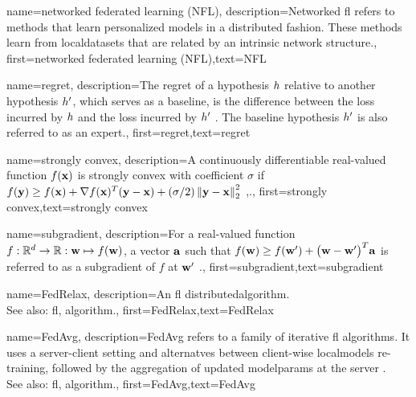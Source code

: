 {name={networked federated learning (NFL)},
	description={Networked \gls{fl} refers 
		to methods that learn personalized \gls{model}s in a distributed fashion. These methods learn from \gls{localdataset}s 
		that are related by an intrinsic network structure.},
 first={networked federated learning (NFL)},text={NFL} 
}




{name={regret},
	description={The regret of a \gls{hypothesis} $h$ relative to 
		another \gls{hypothesis} $h'$, which serves as a \gls{baseline}, 
		is the difference between the \gls{loss} incurred by $h$ and the \gls{loss} 
		incurred by $h'$ \cite{PredictionLearningGames}. 
		The \gls{baseline} \gls{hypothesis} $h'$ is also referred to as an \gls{expert}.},
	first={regret},text={regret} 
}

{name={strongly convex},
	description={A continuously \gls{differentiable} real-valued 
		function $f({\bf x})$ is strongly \gls{convex} with coefficient $\sigma$ if $f({\bf y}) \geq f({\bf x}) + \nabla f({\bf x})^{T} ({\bf y} - {\bf x}) + (\sigma/2) \left\Vert {{\bf y}- {\bf x}} \right\Vert_{2}^{2}$ \cite{nesterov04},\cite[Sec. B.1.1]{CvxAlgBertsekas}.},
	first={strongly convex},text={strongly convex} 
}

{name={subgradient},
description={For a real-valued function $f: \mathbb{R}^{d} \rightarrow \mathbb{R}: {\bf w} \mapsto f({\bf w})$, 
		a vector ${\bf a}$ such that $f({\bf w}) \geq  f({\bf w}') +\big({\bf w}-{\bf w}' \big)^{T} {\bf a}$ is 
		referred to as a subgradient of $f$ at ${\bf w}'$ \cite{BertCvxAnalOpt,BertsekasNonLinProgr}.},
	first={subgradient},text={subgradient} 
}

{name={FedRelax},
	description={An \gls{fl} \gls{distributedalgorithm}. 
		\\ 
		See also: \gls{fl}, \gls{algorithm}.},
	first={FedRelax},text={FedRelax}
} 

{name={FedAvg},
	description={FedAvg refers to a family of iterative \gls{fl} \glspl{algorithm}. 
		It uses a server-client setting and alternatves between client-wise \glspl{localmodel} 
		re-training, followed by the aggregation of updated \gls{modelparams} at the server 
		\cite{pmlr-v54-mcmahan17a}.  
		\\ 
		See also: \gls{fl}, \gls{algorithm}.},
	first={FedAvg},text={FedAvg}
} 

